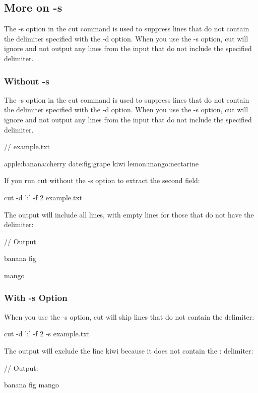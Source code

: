 \documentclass{report}
\begin{document}
    \subsection{More on -s}
    \bigbreak \noindent 
    The -s option in the cut command is used to suppress lines that do not contain the delimiter specified with the -d option. When you use the -s option, cut will ignore and not output any lines from the input that do not include the specified delimiter.
    \bigbreak \noindent 
    \subsubsection{Without -s}
    \bigbreak \noindent 
    The -s option in the cut command is used to suppress lines that do not contain the delimiter specified with the -d option. When you use the -s option, cut will ignore and not output any lines from the input that do not include the specified delimiter.
    \bigbreak \noindent 
    \begin{bashcode}
    // example.txt

    apple:banana:cherry
    date:fig:grape
    kiwi
    lemon:mango:nectarine
    \end{bashcode}
    \bigbreak \noindent 
    If you run cut without the -s option to extract the second field:
    \bigbreak \noindent 
    \begin{bashcode}
        cut -d ':' -f 2 example.txt
    \end{bashcode}
    \bigbreak \noindent 
    The output will include all lines, with empty lines for those that do not have the delimiter:
    \bigbreak \noindent 
    \begin{bashcode}
    // Output

    banana
    fig

    mango
    \end{bashcode}
    \bigbreak \noindent 
    \subsubsection{With -s Option}
    \bigbreak \noindent 
    When you use the -s option, cut will skip lines that do not contain the delimiter:
    \bigbreak \noindent 
    \begin{bashcode}
    cut -d ':' -f 2 -s example.txt
    \end{bashcode}
    \bigbreak \noindent 
    The output will exclude the line kiwi because it does not contain the : delimiter:
    \bigbreak \noindent 
    \begin{bashcode}
    // Output:

    banana
    fig
    mango
    \end{bashcode}
\end{document}
